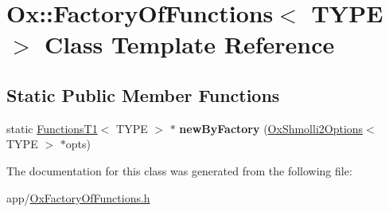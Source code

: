 \hypertarget{class_ox_1_1_factory_of_functions}{\section{Ox\-:\-:Factory\-Of\-Functions$<$ T\-Y\-P\-E $>$ Class Template Reference}
\label{class_ox_1_1_factory_of_functions}
}
\subsection*{Static Public Member Functions}
\begin{DoxyCompactItemize}
\item 
\hypertarget{class_ox_1_1_factory_of_functions_a95eb33682104de25a1191538e150911d}{static \hyperlink{class_ox_1_1_functions_t1}{Functions\-T1}$<$ T\-Y\-P\-E $>$ $\ast$ {\bfseries new\-By\-Factory} (\hyperlink{struct_ox_1_1_ox_shmolli2_options}{Ox\-Shmolli2\-Options}$<$ T\-Y\-P\-E $>$ $\ast$opts)}\label{class_ox_1_1_factory_of_functions_a95eb33682104de25a1191538e150911d}

\end{DoxyCompactItemize}


The documentation for this class was generated from the following file\-:\begin{DoxyCompactItemize}
\item 
app/\hyperlink{_ox_factory_of_functions_8h}{Ox\-Factory\-Of\-Functions.\-h}\end{DoxyCompactItemize}
